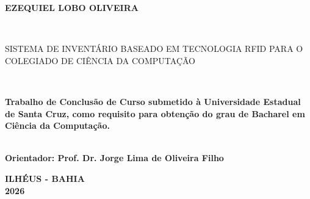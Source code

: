 
\begin{center}

    {\large \begin{large} \bfseries EZEQUIEL LOBO OLIVEIRA\end{large}\\}
    \vspace{8cm}
    {\large\bfseries{\begin{large}SISTEMA DE INVENTÁRIO BASEADO EM TECNOLOGIA RFID PARA O COLEGIADO DE CIÊNCIA DA COMPUTAÇÃO \end{large}}\\}
    \vspace{1cm}
    \hspace{.45\linewidth}
    \begin{minipage}{.50\linewidth}

            \textbf{Trabalho de Conclusão de Curso submetido à Universidade Estadual de Santa Cruz,  como requisito 
            para obtenção do grau de Bacharel em Ciência da Computação. }

            \textbf{\\ Orientador: Prof. Dr. Jorge Lima de Oliveira Filho}
           
    
    \end{minipage}

    \vspace{2cm}
    \vfill
    {\large\bfseries{ ILHÉUS - BAHIA \\ 2026}}
\end{center}

